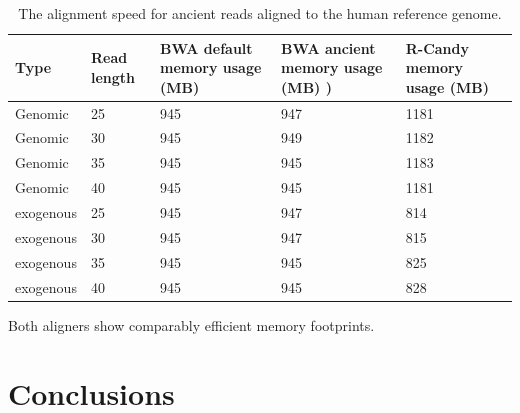 \documentclass[11pt,a4paper]{report}
\begin{document}
\begin{table}[H]
\center
    \begin{tabular}{ | l |p{1cm} | p{2cm} | p{2cm} |p{2cm}| }
    \hline
  	\textbf{Type} & \textbf{Read length }&\textbf{ BWA  
  		default memory usage (MB) }
  	&\textbf{ BWA ancient memory usage (MB) )} 
  	& \textbf{R-Candy memory usage (MB) }\\ \hline
 	  Genomic    & 25  & 945 &  947   &  1181 \\ \hline
      Genomic    & 30  & 945 &  949  &  1182 \\ \hline
      Genomic    & 35  & 945 &  945   &  1183 \\ \hline
 	  Genomic	 & 40  & 945 &  945   &  1181 \\ \hline
 	  exogenous  & 25  & 945 &  947   &  814 \\ \hline
      exogenous  & 30  & 945 &  947   &  815 \\ \hline
 	  exogenous  & 35  & 945 &  945   &  825 \\ \hline
 	  exogenous  & 40  & 945 &  945   &  828 \\ \hline
   \end{tabular}
\caption{The alignment speed for ancient reads aligned to 
the human reference genome.}
\label{speed-RG}
\end{table}

Both aligners show comparably efficient memory footprints.






\section{Conclusions} \label{Conclusions}
\end{document}
